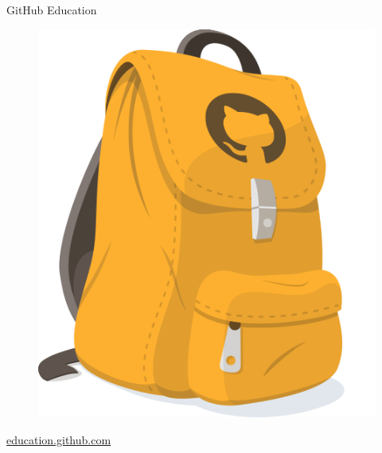 \begin{frame}{GitHub Education}
  \begin{center}
  \begin{figure}
    \includegraphics[scale=0.2]{images/githubEducation}
  \end{figure}
  \href{https://education.github.com}{\Large{education.github.com}}
  \end{center}

\end{frame}

